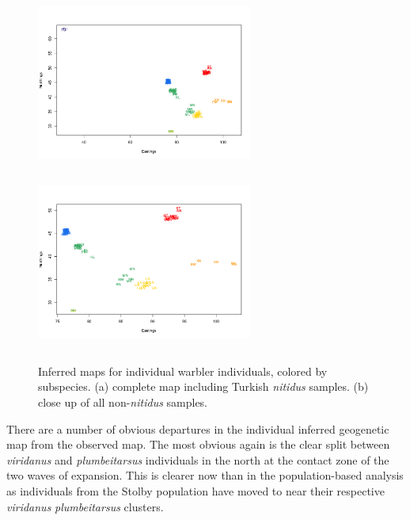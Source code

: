 \documentclass[12pt]{article}
\begin{document}
\begin{figure}
	\centering
			{\includegraphics[width=2.8in,height=2.3in]{figs/warblers/individual_warbler_map_noarrows_randpr1.png}}
			{\includegraphics[width=2.8in,height=2.3in]{figs/warblers/individual_warbler_map_noarrows_closeup_randpr1.png}}
	\caption{Inferred maps for individual warbler individuals, colored by subspecies. (a) complete map including Turkish \textit{nitidus} samples.  (b) close up of all non-\textit{nitidus} samples.}\label{sfig:warbler_inds}
\end{figure}

There are a number of obvious departures in the individual inferred geogenetic map from the observed map. The most obvious again is the clear split between \textit{viridanus} and \textit{plumbeitarsus} individuals in the north at the contact zone of the two waves of expansion.  This is clearer now than in the population-based analysis as individuals from the Stolby population have moved to near their respective \textit{viridanus} \textit{plumbeitarsus}  clusters. 
\end{document}
